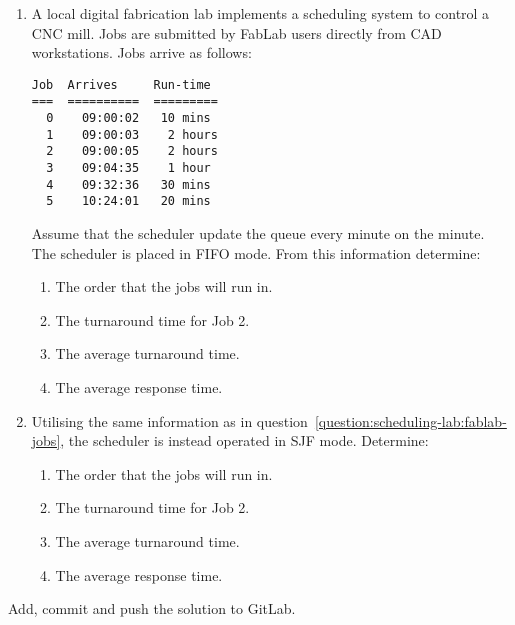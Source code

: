 \begin{enumerate}
\item \label{question:scheduling-lab:fablab-jobs}
  A local digital fabrication lab implements a scheduling system to control a CNC mill.
  Jobs are submitted by FabLab users directly from CAD workstations.
  Jobs arrive as follows:
\begin{verbatim}
Job  Arrives     Run-time
===  ==========  =========
  0    09:00:02   10 mins
  1    09:00:03    2 hours
  2    09:00:05    2 hours
  3    09:04:35    1 hour
  4    09:32:36   30 mins
  5    10:24:01   20 mins
\end{verbatim}
  Assume that the scheduler update the queue every minute on the minute.
  The scheduler is placed in FIFO mode.
  From this information determine:
  \begin{enumerate}
  \item The order that the jobs will run in.
  \item The turnaround time for Job 2.
  \item The average turnaround time.
  \item The average response time.
  \end{enumerate}

\item Utilising the same information as in question~\ref{question:scheduling-lab:fablab-jobs}, the scheduler is instead operated in SJF mode.
  Determine:
  \begin{enumerate}
  \item The order that the jobs will run in.
  \item The turnaround time for Job 2.
  \item The average turnaround time.
  \item The average response time.
  \end{enumerate}

\end{enumerate}

Add, commit and push the solution to GitLab.
